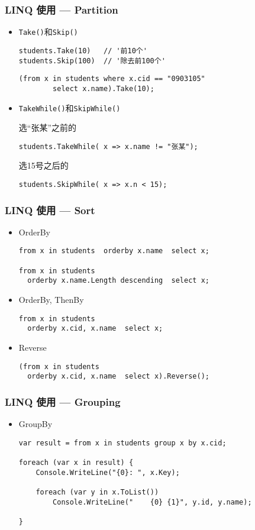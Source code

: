 \begin{frame}[fragile]
\frametitle{LINQ 使用 --- Partition}
\begin{itemize}
\item \texttt{Take()}和\texttt{Skip()}
\begin{lstlisting}[escapeinside='']
students.Take(10)   // '前10个'
students.Skip(100)  // '除去前100个'
\end{lstlisting}

\begin{lstlisting}
(from x in students where x.cid == "0903105"
        select x.name).Take(10);
\end{lstlisting}
\item \texttt{TakeWhile()}和\texttt{SkipWhile()}

选“张某”之前的
\begin{lstlisting}
students.TakeWhile( x => x.name != "张某");
\end{lstlisting}
选15号之后的
\begin{lstlisting}
students.SkipWhile( x => x.n < 15);
\end{lstlisting}
\end{itemize}
\end{frame}




\begin{frame}[fragile]
\frametitle{LINQ 使用 --- Sort}
\begin{itemize}
\item OrderBy
\begin{lstlisting}
from x in students  orderby x.name  select x;

from x in students 
  orderby x.name.Length descending  select x;
\end{lstlisting}
\item OrderBy, ThenBy
\begin{lstlisting}
from x in students
  orderby x.cid, x.name  select x;
\end{lstlisting}
\item Reverse
\begin{lstlisting}
(from x in students
  orderby x.cid, x.name  select x).Reverse();
\end{lstlisting}
\end{itemize}
\end{frame}


\begin{frame}[fragile]
\frametitle{LINQ 使用 --- Grouping}
\begin{itemize}
\item GroupBy
\begin{lstlisting}
var result = from x in students group x by x.cid;

foreach (var x in result) {
    Console.WriteLine("{0}: ", x.Key);

    foreach (var y in x.ToList())
        Console.WriteLine("    {0} {1}", y.id, y.name);

}
\end{lstlisting}
\end{itemize}
\end{frame}

